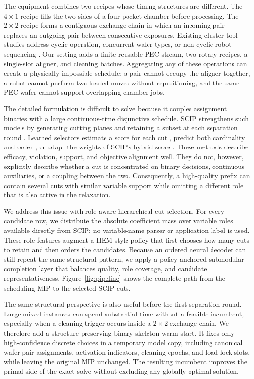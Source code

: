 \documentclass[letterpaper]{article}
\begin{document}
The equipment combines two recipes whose timing structures are different.
The $4\times1$ recipe fills the two sides of a four-pocket chamber before processing.
The $2\times2$ recipe forms a contiguous exchange chain in which an incoming pair replaces an outgoing pair between consecutive exposures.
Existing cluster-tool studies address cyclic operation, concurrent wafer types, or non-cyclic robot sequencing \cite{ahn2025cluster,kim2025adaptive,li2025cyclic,yang2025residency}.
Our setting adds a finite reusable PEC stream, two rotary recipes, a single-slot aligner, and cleaning batches.
Aggregating any of these operations can create a physically impossible schedule: a pair cannot occupy the aligner together, a robot cannot perform two loaded moves without repositioning, and the same PEC wafer cannot support overlapping chamber jobs.

The detailed formulation is difficult to solve because it couples assignment binaries with a large continuous-time disjunctive schedule.
SCIP strengthens such models by generating cutting planes and retaining a subset at each separation round \cite{bestuzheva2023scip}.
Learned selectors estimate a score for each cut \cite{huang2022learning}, predict both cardinality and order \cite{wang2023hem}, or adapt the weights of SCIP's hybrid score \cite{turner2023adaptive}.
These methods describe efficacy, violation, support, and objective alignment well.
They do not, however, explicitly describe whether a cut is concentrated on binary decisions, continuous auxiliaries, or a coupling between the two.
Consequently, a high-quality prefix can contain several cuts with similar variable support while omitting a different role that is also active in the relaxation.

We address this issue with role-aware hierarchical cut selection.
For every candidate row, we distribute the absolute coefficient mass over variable roles available directly from SCIP; no variable-name parser or application label is used.
These role features augment a HEM-style policy that first chooses how many cuts to retain and then orders the candidates.
Because an ordered neural decoder can still repeat the same structural pattern, we apply a policy-anchored submodular completion layer that balances quality, role coverage, and candidate representativeness.
Figure~\ref{fig:pipeline} shows the complete path from the scheduling MIP to the selected SCIP cuts.

The same structural perspective is also useful before the first separation round.
Large mixed instances can spend substantial time without a feasible incumbent, especially when a cleaning trigger occurs inside a $2\times2$ exchange chain.
We therefore add a structure-preserving binary-skeleton warm start.
It fixes only high-confidence discrete choices in a temporary model copy, including canonical wafer-pair assignments, activation indicators, cleaning epochs, and load-lock slots, while leaving the original MIP unchanged.
The resulting incumbent improves the primal side of the exact solve without excluding any globally optimal solution.
\end{document}
